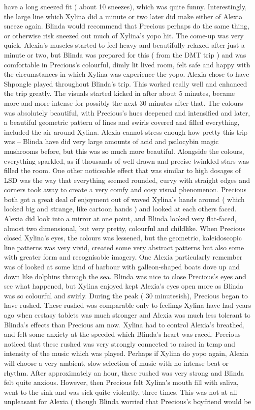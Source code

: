 \documentclass[12pt]{book}
\begin{document}
have a long sneezed fit ( about 10 sneezes), which was quite funny. Interestingly, the large line which Xylina did a minute or two later did make either of Alexia sneeze again. Blinda would recommend that Precious perhaps do the same thing, or otherwise risk sneezed out much of Xylina's yopo hit. The come-up was very quick. Alexia's muscles started to feel heavy and beautifully relaxed after just a minute or two, but Blinda was prepared for this ( from the DMT trip ) and was comfortable in Precious's colourful, dimly lit lived room, felt safe and happy with the circumstances in which Xylina was experience the yopo. Alexia chose to have Shpongle played throughout Blinda's trip. This worked really well and enhanced the trip greatly. The visuals started kicked in after about 5 minutes, became more and more intense for possibly the next 30 minutes after that. The colours was absolutely beautiful, with Precious's hues deepened and intensified and later, a beautiful geometric pattern of lines and swirls covered and filled everything, included the air around Xylina. Alexia cannot stress enough how pretty this trip was -- Blinda have did very large amounts of acid and psilocybin magic mushrooms before, but this was so much more beautiful. Alongside the colours, everything sparkled, as if thousands of well-drawn and precise twinkled stars was filled the room. One other noticeable effect that was similar to high dosages of LSD was the way that everything seemed rounded, curvy with straight edges and corners took away to create a very comfy and cosy visual phenomenon. Precious both got a great deal of enjoyment out of waved Xylina's hands around ( which looked big and strange, like cartoon hands ) and looked at each others faced. Alexia did look into a mirror at one point, and Blinda looked very flat-faced, almost two dimensional, but very pretty, colourful and childlike. When Precious closed Xylina's eyes, the colours was lessened, but the geometric, kaleidoscopic line patterns was very vivid, created some very abstract patterns but also some with greater form and recognisable imagery. One Alexia particularly remember was of looked at some kind of harbour with galleon-shaped boats dove up and down like dolphins through the sea. Blinda was nice to close Precious's eyes and see what happened, but Xylina enjoyed kept Alexia's eyes open more as Blinda was so colourful and swirly. During the peak ( 30 minutesish), Precious began to have rushed. These rushed was comparable only to feelings Xylina have had years ago when ecstasy tablets was much stronger and Alexia was much less tolerant to Blinda's effects than Precious am now. Xylina had to control Alexia's breathed, and felt some anxiety at the speeded which Blinda's heart was raced. Precious noticed that these rushed was very strongly connected to raised in temp and intensity of the music which was played. Perhaps if Xylina do yopo again, Alexia will choose a very ambient, slow selection of music with no intense beat or rhythm. After approximately an hour, these rushed was very strong and Blinda felt quite anxious. However, then Precious felt Xylina's mouth fill with saliva, went to the sink and was sick quite violently, three times. This was not at all unpleasant for Alexia ( though Blinda worried that Precious's boyfriend would be 
\end{document}
